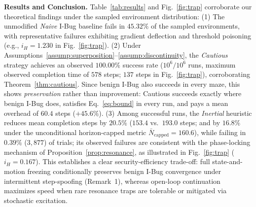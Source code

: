 \documentclass[10pt, a4paper, twocolumn]{article}
\begin{document}
\begin{table}[htbp]
\centering
\scriptsize
\setlength{\tabcolsep}{2.2pt}
\vspace{-0.4em}
\caption{Paired Evaluation ($10^6$ Runs; Step Stats on Succ.\ vs.\ Capped All)}
\label{tab:results}
\vspace{-1.2em}
\end{table}

\noindent\textbf{Results and Conclusion.}
Table~\ref{tab:results} and Fig.~\ref{fig:trap} corroborate our theoretical findings under the sampled environment distribution:
(1) The unmodified \textit{Naive} I-Bug baseline fails in $45.32\%$ of the sampled environments, with representative failures exhibiting gradient deflection and threshold poisoning (e.g., $i_H = 1.230$ in Fig.~\ref{fig:trap}).
(2) Under Assumptions~\ref{assump:superposition}--\ref{assump:discontinuity}, the \textit{Cautious} strategy achieves an observed $100.00\%$ success rate ($10^6 / 10^6$ runs, maximum observed completion time of $578$ steps; $137$ steps in Fig.~\ref{fig:trap}), corroborating Theorem~\ref{thm:cautious}. Since benign I-Bug also succeeds in every maze, this shows \emph{preservation} rather than improvement: Cautious succeeds exactly where benign I-Bug does, satisfies Eq.~\eqref{eq:bound} in every run, and pays a mean overhead of $60.4$ steps ($+45.6\%$).
(3) Among successful runs, the \textit{Inertial} heuristic reduces mean completion steps by $20.5\%$ ($153.4$ vs.\ $193.0$ steps; and by $16.8\%$ under the unconditional horizon-capped metric $\bar{N}_{\text{capped}} = 160.6$), while failing in $0.39\%$ ($3,877$) of trials; its observed failures are consistent with the phase-locking mechanism of Proposition~\ref{prop:resonance}, as illustrated in Fig.~\ref{fig:trap} ($i_H = 0.167$). This establishes a clear security-efficiency trade-off: full state-and-motion freezing conditionally preserves benign I-Bug convergence under intermittent step-spoofing (Remark~1), whereas open-loop continuation maximizes speed when rare resonance traps are tolerable or mitigated via stochastic excitation.
\end{document}
